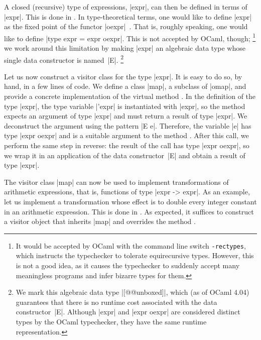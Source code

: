 \documentclass[11pt,a4paper,twoside]{article}
\begin{document}
A closed (recursive) type of expressions, \oc|expr|, can then be defined in
terms of \oc|expr|. This is done in . In type-theoretical
terms, one would like to define \oc|expr| as the fixed point of the functor
\oc|oexpr|~\cite{milewski-13}.
%
That is, roughly speaking, one would like to define \oc|type expr = expr oexpr|.
This is not accepted by OCaml, though;%
%
\footnote{It would be accepted by OCaml with the command line switch
  \texttt{-rectypes}, which instructs the typechecker to tolerate
  equirecursive types. However, this is not a good idea, as it causes
  the typechecker to suddenly accept many meaningless programs and infer
  bizarre types for them.}
%
we work around this limitation by making \oc|expr| an algebraic data type
whose single data constructor is named~\oc|E|.%
%
\footnote{We mark this algebraic data type \oc|[@@unboxed]|, which (as of
  OCaml 4.04) guarantees that there is no runtime cost associated with the
  data constructor~\oc|E|. Although \oc|expr| and \oc|expr oexpr| are
  considered distinct types by the OCaml typechecker, they have the same
  runtime representation.}

Let us now construct a visitor class for the type \oc|expr|. It is easy to
do so, by hand, in a few lines of code.%
%
%
%
We define a class \oc|map|, a subclass of \oc|omap|, and provide a concrete
implementation of the virtual method . In the definition
of the type \oc|expr|, the type variable \oc|'expr| is instantiated with
\oc|expr|, so the method  expects an argument of type
\oc|expr| and must return a result of type \oc|expr|. We deconstruct the
argument using the pattern \oc|E e|. Therefore, the variable \oc|e| has type
\oc|expr oexpr| and is a suitable argument to the method .
After this call, we perform the same step in reverse: the result of the call
has type \oc|expr oexpr|, so we wrap it in an application of the data
constructor~\oc|E| and obtain a result of type \oc|expr|.

The visitor class \oc|map| can now be used to implement transformations of
arithmetic expressions, that is, functions of type \oc|expr -> expr|. As an
example, let us implement a transformation whose effect is to double every
integer constant in an arithmetic expression. This is done in
. As expected, it suffices to construct a visitor
object that inherits \oc|map| and overrides the method
.
\end{document}

